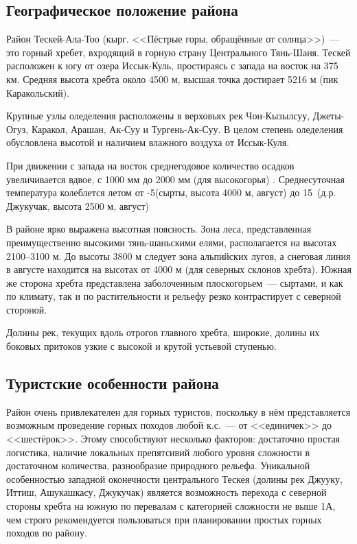 \clearpage

\subsection{Географическое положение района}

Район Тескей-Ала-Тоо (кырг. <<Пёстрые горы, обращённые от солнца>>)~--- это горный хребет, вхродящий в горную страну Центрального Тянь-Шаня. Тескей расположен к югу от озера Иссык-Куль, простираясь с запада на восток на 375 км. Средняя высота хребта около 4500 м, высшая точка достирает 5216 м (пик Каракольский).

Крупные узлы оледеления расположены в верховьях рек Чон-Кызылсуу, Джеты-Огуз, Каракол, Арашан, Ак-Суу и Тургень-Ак-Суу. В целом степень оледеления обусловлена высотой и наличием влажного воздуха от Иссык-Куля.

При движении с запада на восток среднегодовое количество осадков увеличивается вдвое, с 1000 мм до 2000 мм (для высокогорья) \cite{rodina2012}. Среднесуточная температура колеблется летом от -5\degree (сырты, высота 4000 м, август) до 15\degree~(д.р. Джукучак, высота 2500 м, август)

В районе ярко выражена высотная поясность. Зона леса, представленная преимущественно высокими тянь-шаньскими елями, располагается на высотах 2100--3100 м. До высоты 3800 м следует зона альпийских лугов, а снеговая линия в августе находится на высотах от 4000 м (для северных склонов хребта). Южная же сторона хребта представлена заболоченным плоскогорьем~--- сыртами, и как по климату, так и по растительности и рельефу резко контрастирует с северной стороной.

Долины рек, текущих вдоль отрогов главного хребта, широкие, долины их боковых притоков узкие с высокой и крутой устьевой ступенью.

\subsection{Туристские особенности района}
Район очень привлекателен для горных туристов, поскольку в нём представляется возможным проведение горных походов любой к.с.~--- от <<единичек>> до <<шестёрок>>. Этому способствуют несколько факторов: достаточно простая логистика, наличие локальных препятсивий любого уровня сложности в достаточном количества, разнообразие природного рельефа. Уникальной особенностью западной оконечности центрального Тескея (долины рек Джууку, Иттиш, Ашукашкасу, Джукучак) является возможность перехода с северной стороны хребта на южную по перевалам с категорией сложности не выше 1А, чем строго рекомендуется пользоваться при планировании простых горных походов по району.

